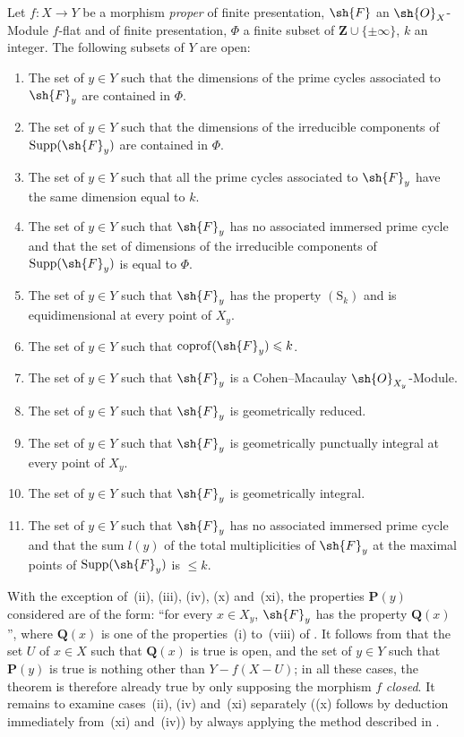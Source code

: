 \begin{theorem}[12.2.1]
\label{IV.12.2.1}
Let $f:X\to Y$ be a morphism \emph{proper} of finite presentation, $\sh{F}$ an $\sh{O}_X$-Module $f$-flat and of finite presentation, $\Phi$ a finite subset of $\mathbf{Z}\cup\{\pm\infty\}$, $k$ an integer.
The following subsets of $Y$ are open:
\begin{enumerate}[label=(\roman*)]
  \item The set of $y\in Y$ such that the dimensions of the prime cycles associated to $\sh{F}_y$ are contained in $\Phi$.
  \item The set of $y\in Y$ such that the dimensions of the irreducible components of $\operatorname{Supp}(\sh{F}_y)$ are contained in $\Phi$.
  \item The set of $y\in Y$ such that all the prime cycles associated to $\sh{F}_y$ have the same dimension equal to $k$.
  \item The set of $y\in Y$ such that $\sh{F}_y$ has no associated immersed prime cycle and that the set of dimensions of the irreducible components of $\operatorname{Supp}(\sh{F}_y)$ is equal to $\Phi$.
  \item The set of $y\in Y$ such that $\sh{F}_y$ has the property $(\mathrm{S}_k)$ and is equidimensional at every point of $X_y$.
  \item The set of $y\in Y$ such that $\operatorname{coprof}(\sh{F}_y)\leqslant k$.
  \item The set of $y\in Y$ such that $\sh{F}_y$ is a Cohen--Macaulay $\sh{O}_{X_y}$-Module.
  \item The set of $y\in Y$ such that $\sh{F}_y$ is geometrically reduced.
  \item The set of $y\in Y$ such that $\sh{F}_y$ is geometrically punctually integral at every point of $X_y$.
  \item The set of $y\in Y$ such that $\sh{F}_y$ is geometrically integral.
  \item The set of $y\in Y$ such that $\sh{F}_y$ has no associated immersed prime cycle and that the sum $l(y)$ of the total multiplicities  of $\sh{F}_y$ at the maximal points of $\operatorname{Supp}(\sh{F}_y)$ is $\leqslant k$.
\end{enumerate}

With the exception of~(ii), (iii), (iv), (x) and~(xi), the properties $\mathbf{P}(y)$ considered are of the form: ``for every $x\in X_y$, $\sh{F}_y$ has the property $\mathbf{Q}(x)$'', where $\mathbf{Q}(x)$ is one of the properties~(i) to~(viii) of .
It follows from  that the set $U$ of $x\in X$ such that $\mathbf{Q}(x)$ is true is open, and the set of $y\in Y$ such that $\mathbf{P}(y)$ is true is nothing other than $Y-f(X-U)$; in all these cases, the theorem is therefore already true by only supposing the morphism $f$ \emph{closed}.
It remains to examine cases~(ii), (iv) and~(xi) separately ((x) follows by deduction immediately from~(xi) and~(iv)) by always applying the method described in .
\end{theorem}

